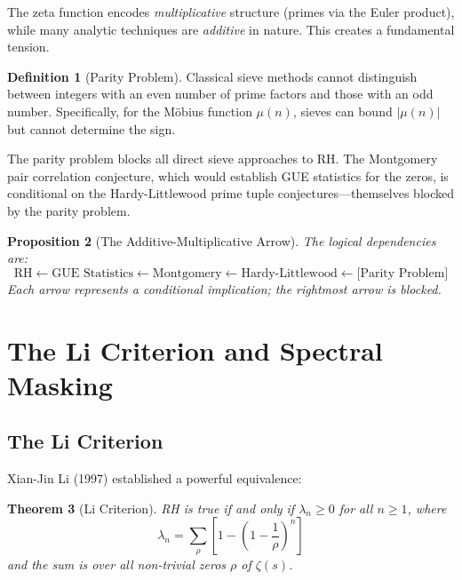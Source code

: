\documentclass[12pt, a4paper]{article}
\newtheorem{theorem}{Theorem}[section]
\newtheorem{proposition}[theorem]{Proposition}
\theoremstyle{definition}
\newtheorem{definition}[theorem]{Definition}
\begin{document}
The zeta function encodes \textit{multiplicative} structure (primes via the Euler product), while many analytic techniques are \textit{additive} in nature. This creates a fundamental tension.

\begin{definition}[Parity Problem]
Classical sieve methods cannot distinguish between integers with an even number of prime factors and those with an odd number. Specifically, for the M\"obius function $\mu(n)$, sieves can bound $|\mu(n)|$ but cannot determine the sign.
\end{definition}

The parity problem blocks all direct sieve approaches to RH. The Montgomery pair correlation conjecture, which would establish GUE statistics for the zeros, is conditional on the Hardy-Littlewood prime tuple conjectures---themselves blocked by the parity problem.

\begin{proposition}[The Additive-Multiplicative Arrow]
The logical dependencies are:
\[
\text{RH} \leftarrow \text{GUE Statistics} \leftarrow \text{Montgomery} \leftarrow \text{Hardy-Littlewood} \leftarrow \text{[Parity Problem]}
\]
Each arrow represents a conditional implication; the rightmost arrow is blocked.
\end{proposition}

\section{The Li Criterion and Spectral Masking}

\subsection{The Li Criterion}

Xian-Jin Li (1997) established a powerful equivalence:

\begin{theorem}[Li Criterion]
RH is true if and only if $\lambda_n \geq 0$ for all $n \geq 1$, where
\begin{equation}
\lambda_n = \sum_{\rho} \left[ 1 - \left(1 - \frac{1}{\rho}\right)^n \right]
\end{equation}
and the sum is over all non-trivial zeros $\rho$ of $\zeta(s)$.
\end{theorem}
\end{document}
